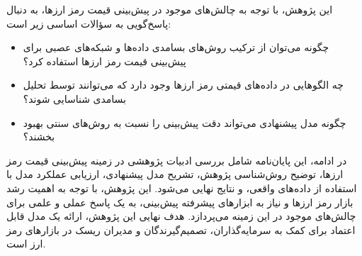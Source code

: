 این پژوهش، با توجه به چالش‌های موجود در پیش‌بینی قیمت رمز ارزها، به دنبال پاسخ‌گویی به سؤالات اساسی زیر است:

\begin{itemize}
	\item چگونه می‌توان از ترکیب روش‌های بسامدی داده‌ها و شبکه‌های عصبی برای پیش‌بینی قیمت رمز ارزها استفاده کرد؟
	\item چه الگوهایی در داده‌های قیمتی رمز ارزها وجود دارد که می‌توانند توسط تحلیل بسامدی شناسایی شوند؟
	\item چگونه مدل پیشنهادی می‌تواند دقت پیش‌بینی را نسبت به روش‌های سنتی بهبود بخشند؟
\end{itemize}

در ادامه، این پایان‌نامه شامل بررسی ادبیات پژوهشی در زمینه پیش‌بینی قیمت رمز ارزها، توضیح روش‌شناسی پژوهش، تشریح مدل پیشنهادی، ارزیابی عملکرد مدل با استفاده از داده‌های واقعی، و نتایج نهایی می‌شود. 
این پژوهش، با توجه به اهمیت رشد بازار رمز ارزها و نیاز به ابزارهای پیشرفته پیش‌بینی، به یک پاسخ عملی و علمی برای چالش‌های موجود در این زمینه می‌پردازد. هدف نهایی این پژوهش، ارائه یک مدل قابل اعتماد برای کمک به سرمایه‌گذاران، تصمیم‌گیرندگان و مدیران ریسک در بازارهای رمز ارز است.